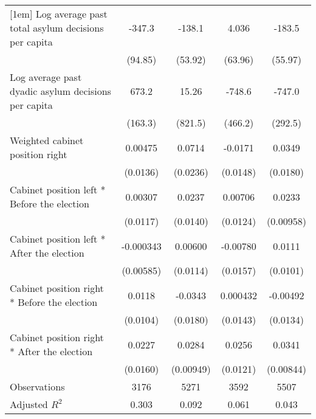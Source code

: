 \begin{table}[htbp]
\begin{tabular}{l*{4}{c}}
[1em]
Log average past total asylum decisions per capita&      -347.3\sym{**} &      -138.1\sym{*}  &       4.036         &      -183.5\sym{**} \\
                    &     (94.85)         &     (53.92)         &     (63.96)         &     (55.97)         \\
[1em]
Log average past dyadic asylum decisions per capita&       673.2\sym{**} &       15.26         &      -748.6         &      -747.0\sym{*}  \\
                    &     (163.3)         &     (821.5)         &     (466.2)         &     (292.5)         \\
[1em]
Weighted cabinet position right&     0.00475         &      0.0714\sym{**} &     -0.0171         &      0.0349         \\
                    &    (0.0136)         &    (0.0236)         &    (0.0148)         &    (0.0180)         \\
[1em]
Cabinet position left * Before the election&     0.00307         &      0.0237         &     0.00706         &      0.0233\sym{*}  \\
                    &    (0.0117)         &    (0.0140)         &    (0.0124)         &   (0.00958)         \\
[1em]
Cabinet position left * After the election&   -0.000343         &     0.00600         &    -0.00780         &      0.0111         \\
                    &   (0.00585)         &    (0.0114)         &    (0.0157)         &    (0.0101)         \\
[1em]
Cabinet position right * Before the election&      0.0118         &     -0.0343         &    0.000432         &    -0.00492         \\
                    &    (0.0104)         &    (0.0180)         &    (0.0143)         &    (0.0134)         \\
[1em]
Cabinet position right * After the election&      0.0227         &      0.0284\sym{**} &      0.0256         &      0.0341\sym{**} \\
                    &    (0.0160)         &   (0.00949)         &    (0.0121)         &   (0.00844)         \\
\hline
Observations        &        3176         &        5271         &        3592         &        5507         \\
Adjusted \(R^{2}\)  &       0.303         &       0.092         &       0.061         &       0.043         \\

\end{tabular}
\end{table}
